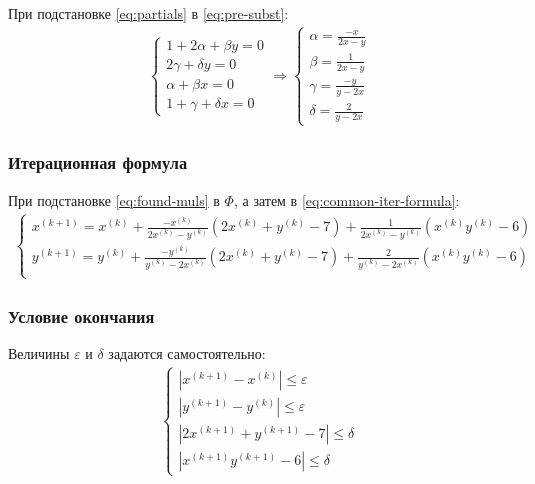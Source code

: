 При подстановке \cref{eq:partials} в \cref{eq:pre-subst}:
\begin{align}\label{eq:found-muls}
	\begin{cases}
		1 + 2 \alpha + \beta y = 0 \\
		2 \gamma + \delta y = 0    \\
		\alpha + \beta x = 0       \\
		1 + \gamma + \delta x = 0
	\end{cases} \Longrightarrow \begin{cases}
		                            \alpha = \frac{-x}{2x - y} \\
		                            \beta = \frac{1}{2x - y}   \\
		                            \gamma = \frac{-y}{y - 2x} \\
		                            \delta = \frac{2}{y - 2x}
	                            \end{cases}
\end{align}

\subsubsection*{Итерационная формула}
При подстановке \cref{eq:found-muls} в \(\Phi\), а затем в \cref{eq:common-iter-formula}:
\begin{align}
	\begin{cases}
		x^{(k + 1)} = x^{(k)} + \frac{-x^{(k)}}{2x^{(k)} - y^{(k)}} (2x^{(k)} + y^{(k)} - 7) + \frac{1}{2x^{(k)}-y^{(k)}} (x^{(k)}y^{(k)} - 6)     \\
		y^{(k + 1)} = y^{(k)} + \frac{-y^{(k)}}{ y^{(k)} - 2x^{(k)} } (2x^{(k)} + y^{(k)} - 7) + \frac{2}{y^{(k)} - 2x^{(k)}} (x^{(k)}y^{(k)} - 6) \\
	\end{cases}
\end{align}
\subsubsection*{Условие окончания}
Величины \(\varepsilon\) и \(\delta\) задаются самостоятельно:
\begin{align}
	\begin{cases}
		|x^{(k+1)} - x^{(k)}| \leq \varepsilon   \\
		|y^{(k+1)} - y^{(k)}| \leq \varepsilon   \\
		|2x^{(k+1)} + y^{(k+1)} - 7| \leq \delta \\
		|x^{(k+1)}y^{(k+1)} - 6| \leq \delta
	\end{cases}
\end{align}
